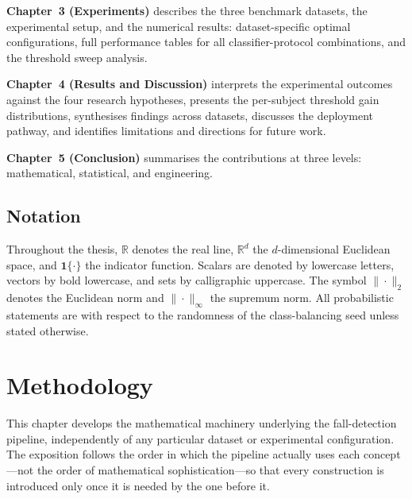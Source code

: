 \documentclass[onluarkali,ingilizce,yukseklisans,karton,LisansustuEgitim]{itutez}
\providecommand{\R}{\mathbb{R}}
\providecommand{\1}{\mathbf{1}}
\begin{document}
\textbf{Chapter~3 (Experiments)} describes the three benchmark datasets, the
experimental setup, and the numerical results: dataset-specific optimal configurations,
full performance tables for all classifier-protocol combinations, and the threshold
sweep analysis.

\textbf{Chapter~4 (Results and Discussion)} interprets the experimental outcomes
against the four research hypotheses, presents the per-subject threshold gain
distributions, synthesises findings across datasets, discusses the deployment
pathway, and identifies limitations and directions for future work.

\textbf{Chapter~5 (Conclusion)} summarises the contributions at three levels:
mathematical, statistical, and engineering.

\section*{Notation}

Throughout the thesis, $\R$ denotes the real line, $\R^d$ the $d$-dimensional
Euclidean space, and $\mathbf{1}\{\cdot\}$ the indicator function.  Scalars are
denoted by lowercase letters, vectors by bold lowercase, and sets by calligraphic
uppercase.  The symbol $\|\cdot\|_2$ denotes the Euclidean norm and
$\|\cdot\|_\infty$ the supremum norm.  All probabilistic statements are with
respect to the randomness of the class-balancing seed unless stated otherwise.

\chapter{Methodology}
\label{sec:methodology}

This chapter develops the mathematical machinery underlying the fall-detection pipeline, independently of any particular dataset or experimental configuration. The exposition follows the order in which the pipeline actually uses each concept---not the order of mathematical sophistication---so that every construction is introduced only once it is needed by the one before it.
\end{document}
